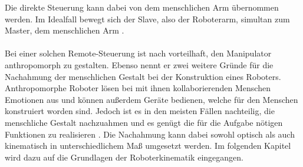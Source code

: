   Die direkte Steuerung kann dabei von dem menschlichen Arm übernommen werden. Im Idealfall bewegt sich der Slave, also der Roboterarm, simultan zum Master, dem menschlichen Arm \cite[S.11]{mareczek_grundlagen_2020}. \\\\
  Bei einer solchen Remote-Steuerung ist nach \cite{tanie_mfi_2003} vorteilhaft, den Manipulator anthropomorph zu gestalten. Ebenso nennt er zwei weitere Gründe für die Nachahmung der menschlichen Gestalt bei der Konstruktion eines Roboters. Anthropomorphe Roboter lösen bei mit ihnen kollaborierenden Menschen Emotionen aus und können außerdem Geräte bedienen, welche für den Menschen konstruiert worden sind. Jedoch ist es in den meisten Fällen nachteilig, die menschliche Gestalt nachzuahmen und es genügt die für die Aufgabe nötigen Funktionen zu realisieren \cite{tanie_mfi_2003}. Die Nachahmung kann dabei sowohl optisch als auch kinematisch in unterschiedlichem Maß umgesetzt werden. Im folgenden Kapitel wird dazu auf die Grundlagen der Roboterkinematik eingegangen. \\\\
